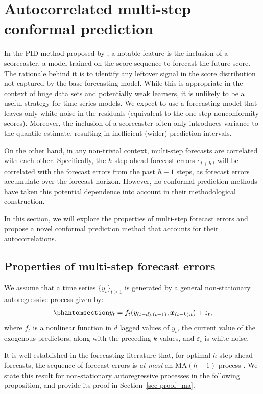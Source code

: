 \documentclass[
  11pt,
  a4paper,
]{article}
\theoremstyle{plain}
\theoremstyle{remark}
\begin{document}
\section{Autocorrelated multi-step conformal
prediction}\label{sec-acmcp}

In the PID method proposed by \textcite{angelopoulos2024}, a notable
feature is the inclusion of a scorecaster, a model trained on the score
sequence to forecast the future score. The rationale behind it is to
identify any leftover signal in the score distribution not captured by
the base forecasting model. While this is appropriate in the context of
huge data sets and potentially weak learners, it is unlikely to be a
useful strategy for time series models. We expect to use a forecasting
model that leaves only white noise in the residuals (equivalent to the
one-step nonconformity scores). Moreover, the inclusion of a scorecaster
often only introduces variance to the quantile estimate, resulting in
inefficient (wider) prediction intervals.

On the other hand, in any non-trivial context, multi-step forecasts are
correlated with each other. Specifically, the \(h\)-step-ahead forecast
errors \(e_{t+h|t}\) will be correlated with the forecast errors from
the past \(h-1\) steps, as forecast errors accumulate over the forecast
horizon. However, no conformal prediction methods have taken this
potential dependence into account in their methodological construction.

In this section, we will explore the properties of multi-step forecast
errors and propose a novel conformal prediction method that accounts for
their autocorrelations.

\subsection{Properties of multi-step forecast errors}\label{sec-ppt}

We assume that a time series \(\{y_t\}_{t \geq 1}\) is generated by a
general non-stationary autoregressive process given by:
\begin{equation}\phantomsection\label{eq-dgp}{
y_t = f_{t}(y_{(t-d):(t-1)},\bm{x}_{(t-k):t}) + \varepsilon_t,
}\end{equation} where \(f_{t}\) is a nonlinear function in \(d\) lagged
values of \(y_t\), the current value of the exogenous predictors, along
with the preceding \(k\) values, and \(\varepsilon_t\) is white noise.

It is well-established in the forecasting literature that, for optimal
\(h\)-step-ahead forecasts, the sequence of forecast errors is \emph{at
most} an MA\((h-1)\) process \autocite{harvey1997,diebold2024}. We state
this result for non-stationary autoregressive processes in the following
proposition, and provide its proof in Section~\ref{sec-proof_ma}.
\end{document}
